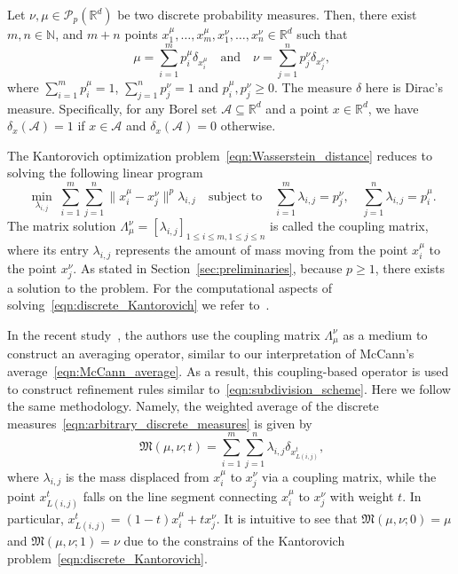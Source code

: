 \documentclass[12pt]{amsart}
\begin{document}
Let $\nu,\mu\in\mathcal{P}_p(\mathbb{R}^d)$ be two discrete probability measures. Then, there exist $m,n\in\mathbb{N}$, and $m+n$ points $x^\mu_1,\dots, x^\mu_m, x^\nu_1, \dots, x^\nu_n\in\mathbb{R}^d$ such that
\begin{equation}~\label{eqn:arbitrary_discrete_measures}
    \mu = \sum_{i=1}^m p^\mu_{i}\delta_{x^\mu_i} \quad \text{and} \quad \nu=\sum_{j=1}^n p^\nu_j\delta_{x^\nu_j},
\end{equation}
where $\sum_{i=1}^m p^\mu_i=1$, $\sum_{j=1}^np^\nu_j=1$ and $p^\mu_i,p^\nu_j\geq0$. The measure $\delta$ here is Dirac's measure. Specifically, for any Borel set $\mathcal{A}\subseteq \mathbb{R}^d$ and a point $x\in\mathbb{R}^d$, we have $\delta_{x}(\mathcal{A})=1$ if $x\in\mathcal{A}$ and $\delta_{x}(\mathcal{A})=0$ otherwise.

The Kantorovich optimization problem~\eqref{eqn:Wasserstein_distance} reduces to solving the following linear program
\begin{equation}~\label{eqn:discrete_Kantorovich}
    \min_{\lambda_{i, j}} \;\sum_{i=1}^m\sum_{j=1}^n\big\|x^\mu_i-x^\nu_j\big\|^p\lambda_{i, j} \quad \text{subject to} \quad \sum_{i=1}^m\lambda_{i, j}=p^\nu_j, \quad \sum_{j=1}^n\lambda_{i, j}=p^\mu_i.
\end{equation}
The matrix solution $\Lambda_{\mu}^\nu=[\lambda_{i,j}]_{1\leq i\leq m, 1\leq j\leq n}$ is called the coupling matrix, where its entry $\lambda_{i, j}$ represents the amount of mass moving from the point $x^\mu_i$ to the point $x^\nu_j$. As stated in Section~\ref{sec:preliminaries}, because $p\geq 1$, there exists a solution to the problem. For the computational aspects of solving~\eqref{eqn:discrete_Kantorovich} we refer to~\cite{peyre2019computational}.

In the recent study~\cite{baccou2024subdivision}, the authors use the coupling matrix $\Lambda_\mu^\nu$ as a medium to construct an averaging operator, similar to our interpretation of McCann's average~\eqref{eqn:McCann_average}. As a result, this coupling-based operator is used to construct refinement rules similar to~\eqref{eqn:subdivision_scheme}. Here we follow the same methodology. Namely, the weighted average of the discrete measures~\eqref{eqn:arbitrary_discrete_measures} is given by
\begin{equation}~\label{eqn:discrete_McCann_average}
    \mathfrak{M}(\mu, \nu; t) = \sum_{i=1}^m\sum_{j=1}^n\lambda_{i,j}\delta_{x^t_{L(i, j)}},
\end{equation}
where $\lambda_{i,j}$ is the mass displaced from $x^\mu_i$ to $x^\nu_j$ via a coupling matrix, while the point $x^t_{L(i, j)}$ falls on the line segment connecting $x^\mu_i$ to $x^\nu_j$ with weight $t$. In particular, $x^t_{L(i,j)} = (1-t)x^\mu_i + tx^\nu_j$. It is intuitive to see that $\mathfrak{M}(\mu,\nu;0)=\mu$ and $\mathfrak{M}(\mu,\nu;1)=\nu$ due to the constrains of the Kantorovich problem~\eqref{eqn:discrete_Kantorovich}.
\end{document}

